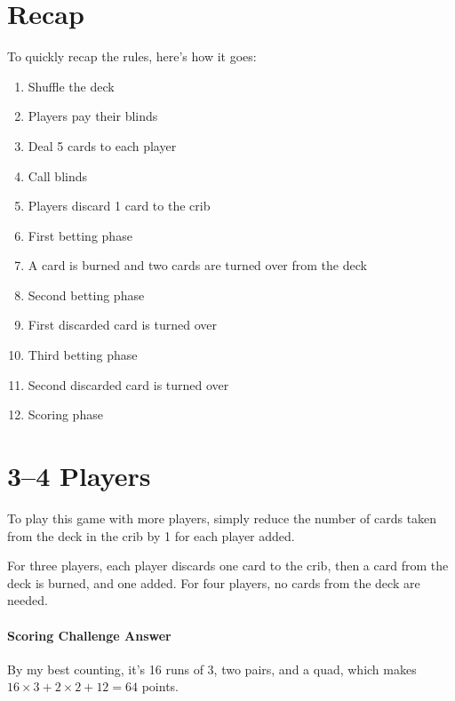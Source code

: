 \documentclass{article}
\begin{document}
\newpage
\section{Recap}

To quickly recap the rules, here's how it goes:

\begin{enumerate}
    \item Shuffle the deck
    \item Players pay their blinds
    \item Deal 5 cards to each player
    \item Call blinds
    \item Players discard 1 card to the crib
    \item First betting phase
    \item A card is burned and two cards are turned over from the deck
    \item Second betting phase
    \item First discarded card is turned over
    \item Third betting phase
    \item Second discarded card is turned over
    \item Scoring phase
\end{enumerate}

\section{3--4 Players}
To play this game with more players, simply reduce the number of cards taken from the deck in the crib by 1 for each player added.

For three players, each player discards one card to the crib, then a card from the deck is burned, and one added. For four players, no cards from the deck are needed.

\paragraph{Scoring Challenge Answer}
By my best counting, it's 16 runs of 3, two pairs, and a quad, which makes $16 \times 3 + 2 \times 2 + 12 = 64$ points.
\end{document}
